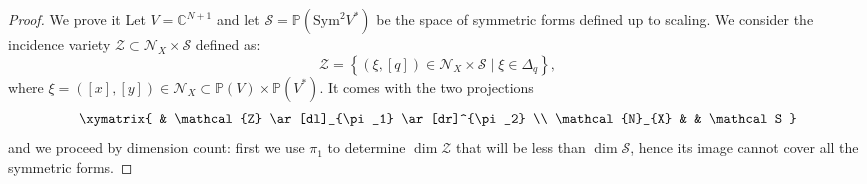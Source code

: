 \documentclass[11pt]{article}
\numberwithin{equation}{section}
\numberwithin{figure}{section}
\theoremstyle{plain}
\theoremstyle{definition}
\theoremstyle{remark}
\begin{document}
\begin{proof}
We prove it
Let $V = \mathbb{C}^{N+1}$ and let $\mathcal{S} = \mathbb{P}\left( \mathrm{Sym}^{2} V^{\ast} \right)$ be the space of symmetric forms defined up to scaling. We consider the incidence variety $\mathcal{Z} \subset \mathcal{N}_{X} \times \mathcal{S}$ defined as:
\[
\mathcal{Z} = \left\{ \left( \xi, \left[ q \right] \right) \in \mathcal{N}_{X} \times \mathcal{S} \mid \xi \in \Delta_{q} \right\},
\]
where $\xi = \left( \left[ x \right], \left[ y \right] \right) \in \mathcal{N}_{X} \subset \mathbb{P}\left( V \right) \times \mathbb{P}\left( V^{\ast} \right)$. It comes with the two projections
\[
\xymatrix{
& \mathcal{Z} \ar[dl]_{\pi_1} \ar[dr]^{\pi_2} \\
\mathcal{N}_{X} & & \mathcal S
}
\]
and we proceed by dimension count: first we use $\pi_1$ to determine $\dim\mathcal Z$ that will be less than $\dim\mathcal S$, hence its image cannot cover all the symmetric forms.


\end{proof}
\end{document}
